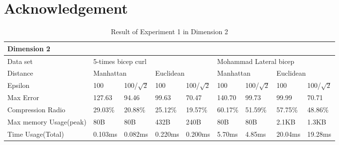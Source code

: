 \documentclass[10pt, conference, compsocconf]{IEEEtran}
\begin{document}
\section*{Acknowledgement}
\begin{table*}[]
    \begin{center}
    \caption{Result of Experiment 1 in Dimension 2}
    \begin{tabular}{|l|l|l|l|l|l|l|l|l|}
    \hline
    \multicolumn{9}{|l|}{Dimension 2}                                                                                                                         \\ \hline
    Data set               & \multicolumn{4}{l|}{5-times bicep curl}                        & \multicolumn{4}{l|}{Mohammad Lateral bicep}                     \\ \hline
    Distance               & \multicolumn{2}{l|}{Manhattan} & \multicolumn{2}{l|}{Euclidean} & \multicolumn{2}{l|}{Manhattan} & \multicolumn{2}{l|}{Euclidean} \\ \hline
    Epsilon                & 100          & 100/$\sqrt{2}$  & 100         & 100/$\sqrt{2}$  & 100        & 100/$\sqrt{2}$    & 100        & 100/$\sqrt{2}$    \\ \hline
    Max Error              & 127.63       & 94.46           & 99.63       & 70.47           & 140.70     & 99.73             & 99.99      & 70.71             \\ \hline
    Compression Radio      & 29.03\%      & 20.88\%         & 25.12\%     & 19.57\%         & 60.17\%    & 51.59\%           & 57.75\%    & 48.86\%           \\ \hline
    Max memory Usage(peak) & 80B          & 80B             & 432B        & 240B            & 80B        & 80B               & 2.1KB      & 1.3KB             \\ \hline
    Time Usage(Total)      & 0.103ms      & 0.082ms         & 0.220ms     & 0.200ms         & 5.70ms     & 4.85ms            & 20.04ms    & 19.28ms           \\ \hline
    \end{tabular}
    \end{center}
\end{table*}
\end{document}
